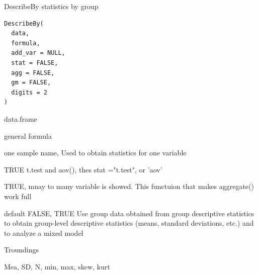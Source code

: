 \documentclass[a4paper]{book}
\begin{document}
%
\begin{Description}
DescribeBy  statistics by group
\end{Description}
%
\begin{Usage}
\begin{verbatim}
DescribeBy(
  data,
  formula,
  add_var = NULL,
  stat = FALSE,
  agg = FALSE,
  gm = FALSE,
  digits = 2
)
\end{verbatim}
\end{Usage}
%
\begin{Arguments}
\begin{ldescription}
\item[\code{data}] data.frame

\item[\code{formula}] general formula

\item[\code{add\_var}] one sample name, Used to obtain statistics for one variable

\item[\code{stat}] TRUE t.test and aov(), thes stat ="t.test", or 'aov'

\item[\code{agg}] TRUE, mnay to many variable is showed. This functuion that makes aggregate() work full

\item[\code{gm}] default FALSE, TRUE Use group data obtained from group descriptive statistics to obtain group-level descriptive statistics (means, standard deviations, etc.) and to analyze a mixed model

\item[\code{digits}] Troundings
\end{ldescription}
\end{Arguments}
%
\begin{Value}
Mea, SD, N, min, max, skew, kurt
\end{Value}
%
\end{document}
